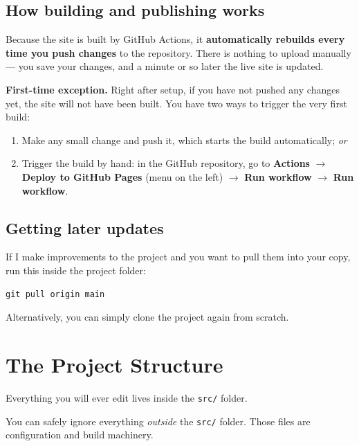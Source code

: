 \documentclass[11pt,a4paper]{article}
\newcommand{\file}[1]{\texttt{#1}}
\begin{document}
\subsection{How building and publishing works}

Because the site is built by GitHub Actions, it \textbf{automatically
rebuilds every time you push changes} to the repository. There is nothing
to upload manually — you save your changes, and a minute or so later the
live site is updated.

\begin{notebox}
\textbf{First-time exception.} Right after setup, if you have not pushed
any changes yet, the site will not have been built. You have two ways to
trigger the very first build:
\begin{enumerate}[leftmargin=1.6em]
  \item Make any small change and push it, which starts the build
        automatically; \emph{or}
  \item Trigger the build by hand: in the GitHub repository, go to
        \textbf{Actions} $\rightarrow$ \textbf{Deploy to GitHub Pages}
        (menu on the left) $\rightarrow$ \textbf{Run workflow}
        $\rightarrow$ \textbf{Run workflow}.
\end{enumerate}
\end{notebox}

\subsection{Getting later updates}

If I make improvements to the project and you want to pull
them into your copy, run this inside the project folder:

\begin{lstlisting}[style=shell]
git pull origin main
\end{lstlisting}

\noindent Alternatively, you can simply clone the project again from
scratch.

\section{The Project Structure}

Everything you will ever edit lives inside the \file{src/} folder.

\begin{tipbox}
You can safely ignore everything \emph{outside} the \file{src/} folder.
Those files are configuration and build machinery.
\end{tipbox}
\end{document}
